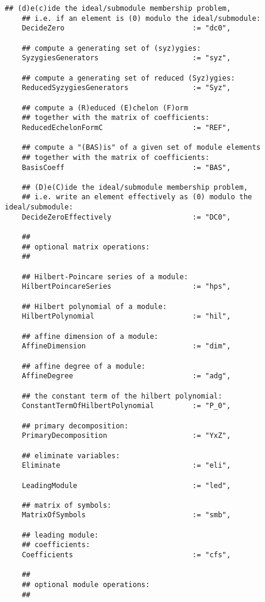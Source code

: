 \documentclass[a4paper,11pt]{report}
\begin{document}
{{{\begin{Verbatim}[fontsize=\small,frame=single,label=Code]
    ## (d)e(c)ide the ideal/submodule membership problem,
    ## i.e. if an element is (0) modulo the ideal/submodule:
    DecideZero                              := "dc0",
    
    ## compute a generating set of (syz)ygies:
    SyzygiesGenerators                      := "syz",
    
    ## compute a generating set of reduced (Syz)ygies:
    ReducedSyzygiesGenerators               := "Syz",
    
    ## compute a (R)educed (E)chelon (F)orm
    ## together with the matrix of coefficients:
    ReducedEchelonFormC                     := "REF",
    
    ## compute a "(BAS)is" of a given set of module elements
    ## together with the matrix of coefficients:
    BasisCoeff                              := "BAS",
    
    ## (D)e(C)ide the ideal/submodule membership problem,
    ## i.e. write an element effectively as (0) modulo the ideal/submodule:
    DecideZeroEffectively                   := "DC0",
    
    ##
    ## optional matrix operations:
    ##
    
    ## Hilbert-Poincare series of a module:
    HilbertPoincareSeries                   := "hps",
    
    ## Hilbert polynomial of a module:
    HilbertPolynomial                       := "hil",
    
    ## affine dimension of a module:
    AffineDimension                         := "dim",
    
    ## affine degree of a module:
    AffineDegree                            := "adg",
    
    ## the constant term of the hilbert polynomial:
    ConstantTermOfHilbertPolynomial         := "P_0",
    
    ## primary decomposition:
    PrimaryDecomposition                    := "YxZ",
    
    ## eliminate variables:
    Eliminate                               := "eli",
    
    LeadingModule                           := "led",
    
    ## matrix of symbols:
    MatrixOfSymbols                         := "smb",
    
    ## leading module:
    ## coefficients:
    Coefficients                            := "cfs",
    
    ##
    ## optional module operations:
    ##
    

\end{Verbatim}}}}
\end{document}
